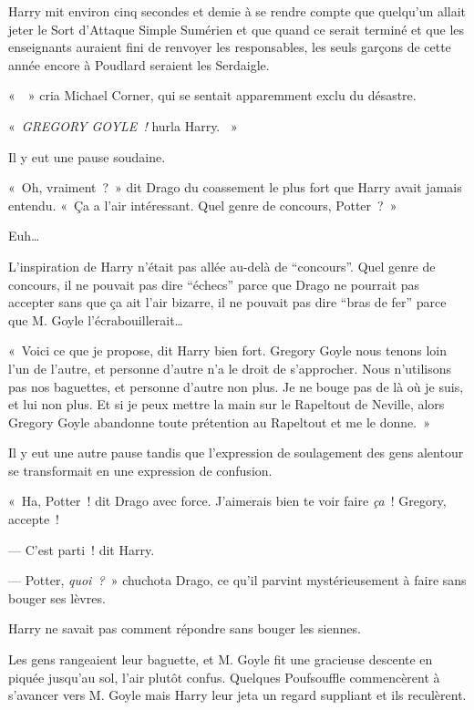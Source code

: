 Harry mit environ cinq secondes et demie à se rendre compte que quelqu'un allait jeter le Sort d'Attaque Simple Sumérien et que quand ce serait terminé et que les enseignants auraient fini de renvoyer les responsables, les seuls garçons de cette année encore à Poudlard seraient les Serdaigle.

«~~» cria Michael Corner, qui se sentait apparemment exclu du désastre.

«~\emph{GREGORY GOYLE~!} hurla Harry. ~»

Il y eut une pause soudaine.

«~Oh, vraiment~?~» dit Drago du coassement le plus fort que Harry avait jamais entendu. «~Ça a l'air intéressant. Quel genre de concours, Potter~?~»

Euh…

L'inspiration de Harry n'était pas allée au-delà de “concours”. Quel genre de concours, il ne pouvait pas dire “échecs” parce que Drago ne pourrait pas accepter sans que ça ait l'air bizarre, il ne pouvait pas dire “bras de fer” parce que M. Goyle l'écrabouillerait…

«~Voici ce que je propose, dit Harry bien fort. Gregory Goyle nous tenons loin l'un de l'autre, et personne d'autre n'a le droit de s'approcher. Nous n'utilisons pas nos baguettes, et personne d'autre non plus. Je ne bouge pas de là où je suis, et lui non plus. Et si je peux mettre la main sur le Rapeltout de Neville, alors Gregory Goyle abandonne toute prétention au Rapeltout et me le donne.~»

Il y eut une autre pause tandis que l'expression de soulagement des gens alentour se transformait en une expression de confusion.

«~Ha, Potter~! dit Drago avec force. J'aimerais bien te voir faire \emph{ça}~! Gregory, accepte~!

--- C'est parti~! dit Harry.

--- Potter, \emph{quoi~?}~» chuchota Drago, ce qu'il parvint mystérieusement à faire sans bouger ses lèvres.

Harry ne savait pas comment répondre sans bouger les siennes.

Les gens rangeaient leur baguette, et M. Goyle fit une gracieuse descente en piquée jusqu'au sol, l'air plutôt confus. Quelques Poufsouffle commencèrent à s'avancer vers M. Goyle mais Harry leur jeta un regard suppliant et ils reculèrent.

